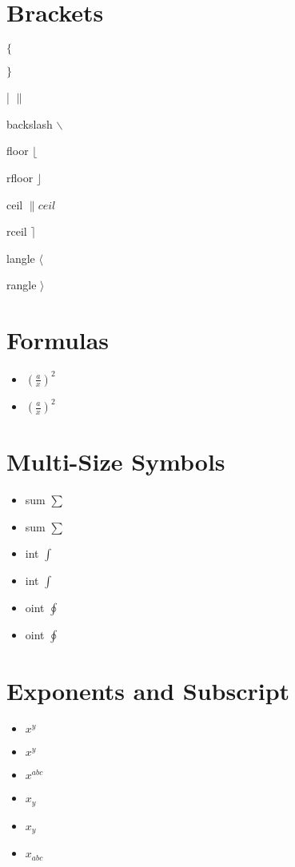 \documentclass[11pt]{article}  %
\begin{document}
\section*{Brackets}
\begin{itemize}
\item { $\{$
\item } $\}$
\item | $\|$
\item backslash $\backslash$
\item floor $\lfloor$
\item rfloor $\rfloor$
\item ceil $\|ceil$
\item rceil $\rceil$
\item langle $\langle$
\item rangle $\rangle$
\end{itemize}

\section*{Formulas}
\begin{itemize}
\item $(\frac{a}{x})^2$  %
\item $\left(\frac{a}{x} \right)^2$  %
\end{itemize}

\section*{Multi-Size Symbols}
\begin{itemize}
\item sum $\displaystyle \sum$  %
\item sum $\sum$
\item int $\displaystyle \int$
\item int $\int$
\item oint $\displaystyle \oint$
\item oint $\oint$
\end{itemize}

\section*{Exponents and Subscript}
\begin{itemize}
\item $x^y$  %
\item $x^{y}$  %
\item $x^{abc}$  %
\item $x_y$  %
\item $x_{y}$  %
\item $x_{abc}$  %
\end{itemize}
\end{document}
